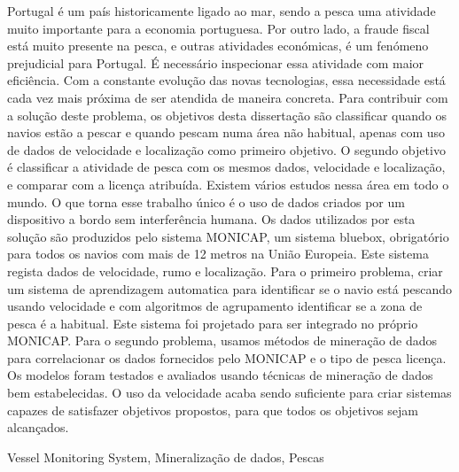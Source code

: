 \abstractPT  %

Portugal é um país historicamente ligado ao mar, sendo a pesca uma atividade muito importante para a economia portuguesa. Por outro lado, a fraude fiscal está muito presente na pesca, e outras atividades económicas, é um fenómeno prejudicial para Portugal. É necessário inspecionar essa atividade com maior eficiência. Com a constante evolução das novas tecnologias, essa necessidade está cada vez mais próxima de ser atendida de maneira concreta.
Para contribuir com a solução deste problema, os objetivos desta dissertação são classificar quando os navios estão a pescar e quando pescam numa área não habitual, apenas com uso de dados de velocidade e localização como primeiro objetivo. O segundo objetivo é classificar a atividade de pesca com os mesmos dados, velocidade e localização, e comparar com a licença atribuída.
Existem vários estudos nessa área em todo o mundo. O que torna esse trabalho único é o uso de dados criados por um dispositivo a bordo sem interferência humana. 
Os dados utilizados por esta solução são produzidos pelo sistema MONICAP, um sistema bluebox, obrigatório para todos os navios com mais de 12 metros na União Europeia. Este sistema regista dados de velocidade, rumo e localização.
Para o primeiro problema, criar um sistema de aprendizagem automatica para identificar se o navio está pescando usando velocidade e com algoritmos de agrupamento identificar se a zona de pesca é a habitual. Este sistema foi projetado para ser integrado no próprio MONICAP. Para o segundo problema, usamos métodos de mineração de dados para correlacionar os dados fornecidos pelo MONICAP e o tipo de pesca licença.
Os modelos foram testados e avaliados usando técnicas de mineração de dados bem estabelecidas.
O uso da velocidade acaba sendo suficiente para criar sistemas capazes de satisfazer
objetivos propostos, para que todos os objetivos sejam alcançados.

\begin{keywords}
Vessel Monitoring System, Mineralização de dados, Pescas
\end{keywords}
